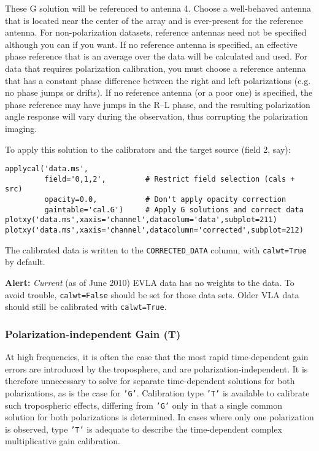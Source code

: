 These G solution will be referenced to antenna 4.  Choose a
well-behaved antenna that is located near the center of the array and
is ever-present for the reference antenna.  For non-polarization
datasets, reference antennas need not be specified although you can if
you want.  If no reference antenna is specified, an effective phase
reference that is an average over the data will be calculated and
used.  For data that requires polarization calibration, you must
choose a reference antenna that has a constant phase difference
between the right and left polarizations (e.g. no phase jumps or
drifts).  If no reference antenna (or a poor one) is specified, the
phase reference may have jumps in the R--L phase, and the resulting
polarization angle response will vary during the observation, thus
corrupting the polarization imaging.

To apply this solution to the calibrators and the target source (field
2, say):
\small
\begin{verbatim}
applycal('data.ms',
         field='0,1,2',         # Restrict field selection (cals + src)
         opacity=0.0,           # Don't apply opacity correction
         gaintable='cal.G')     # Apply G solutions and correct data
plotxy('data.ms',xaxis='channel',datacolum='data',subplot=211)
plotxy('data.ms',xaxis='channel',datacolumn='corrected',subplot=212)
\end{verbatim}
\normalsize
The calibrated data is written to the {\tt CORRECTED\_DATA} column, with 
{\tt calwt=True} by default.

{\bf Alert:} {\it Current} (as of June 2010)  EVLA data has no weights
to the data. To avoid trouble, {\tt calwt=False} should be set for
those data sets. Older VLA data should still be calibrated with  {\tt calwt=True}.

\subsubsection{Polarization-independent Gain (T)}
\label{section:cal.solve.gain.t}

At high frequencies, it is often the case that the most rapid
time-dependent gain errors are introduced by the troposphere, and are
polarization-independent.  It is therefore unnecessary to solve for
separate time-dependent solutions for both polarizations, as is the
case for {\tt 'G'}.  Calibration type {\tt 'T'} is available to calibrate such
tropospheric effects, differing from {\tt 'G'} only in that a single common
solution for both polarizations is determined.  In cases where only
one polarization is observed, type {\tt 'T'} is adequate to describe the
time-dependent complex multiplicative gain calibration.

